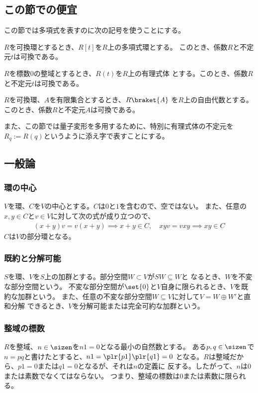 {\subsection{この節での便宜}\label{s2:この節での便宜} %
	この節では多項式を表すのに次の記号を使うことにする。
	\begin{description}\setlength{\itemsep}{-1mm} %
		\item[多項式環] $R$を可換環とするとき、$R[t]$を$R$上の多項式環とする。
		このとき、係数$R$と不定元$t$は可換である。
		\item[有理式体] $R$を標数$0$の整域とするとき、$R(t)$を$R$上の有理式体
		とする。このとき、係数$R$と不定元$t$は可換である。
		\item[自由代数] $R$を可換環、$A$を有限集合とするとき、$R\braket{A}$
		を$R$上の自由代数とする。このとき、係数$R$と不定元$A$は可換である。
	\end{description} %
	また、この節では量子変形を多用するために、特別に有理式体の不定元を
	$R_q:=R(q)$というように添え字で表すことにする。
\subsection{一般論}\label{s2:一般論} %
\subsubsection{環の中心}\label{s3:環の中心} %
	$V$を環、$C$を$V$の中心とする。$C$は$0$と$1$を含むので、空ではない。
	また、任意の$x,y\in C$と$v\in V$に対して次の式が成り立つので、
	\begin{equation*}\begin{split}
		(x+y)v = v(x+y) \implies x + y\in C,\quad xyv = vxy \implies xy\in C
	\end{split}\end{equation*}
	$C$は$V$の部分環となる。
\subsubsection{既約と分解可能}\label{s3:既約と分解可能} %
	$S$を環、$V$を$S$上の加群とする。部分空間$W\subset V$が$SW\subseteq W$と
	なるとき、$W$を不変な部分空間という。
	不変な部分空間が$\set{0}$と$V$自身に限られるとき、$V$を既約な加群という。
	また、任意の不変な部分空間$W\subseteq V$に対して$V=W\oplus W'$と直和分解
	できるとき、$V$を分解可能または完全可約な加群という。
\subsubsection{整域の標数}\label{s3:整域の標数} %
	$R$を整域、$n\in\sizen$を$n1=0$となる最小の自然数とする。
	ある$p,q\in\sizen$で$n=pq$と書けたとすると、$n1=\plr{p1}\plr{q1}=0$
	となる。$R$は整域だから、$p1=0$または$q1=0$となるが、それは$n$の定義に
	反する。したがって、$n$は$0$または素数でなくてはならない。
	つまり、整域の標数は$0$または素数に限られる。
}
